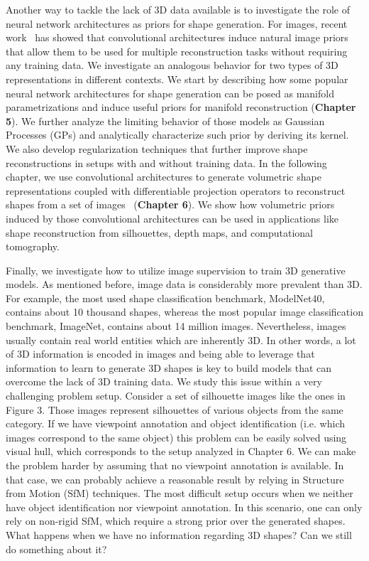 Another way to tackle the lack of 3D data available is to investigate the role of neural
network architectures as priors for shape generation.
For images, recent work~\cite{dip} has showed that convolutional architectures induce natural image priors
that allow them to be used for multiple reconstruction tasks without requiring any training data.
We investigate an analogous behavior for two types of 3D representations in different contexts.
We start by describing how some popular neural network architectures for shape generation can be
posed as manifold parametrizations and induce useful priors for manifold reconstruction
(\textbf{Chapter 5}).
We further analyze the limiting behavior of those models as Gaussian Processes (GPs) and
analytically characterize such prior by deriving its kernel.
We also develop regularization techniques that further improve shape reconstructions in setups
with and without training data.
In the following chapter, we use convolutional architectures to generate volumetric shape
representations coupled with differentiable projection operators to reconstruct shapes from
a set of images~\cite{deepshapeprior} (\textbf{Chapter 6}).
We show how volumetric priors induced by those convolutional architectures can be used in applications
like shape reconstruction from silhouettes, depth maps, and computational tomography.

Finally, we investigate how to utilize image supervision to train 3D generative models.
As mentioned before, image data is considerably more prevalent than 3D.
For example, the most used shape classification benchmark, ModelNet40, contains about 10 thousand shapes,
whereas the most popular image classification benchmark, ImageNet, contains about 14 million images.
Nevertheless, images usually contain real world entities which are inherently 3D.
In other words, a lot of 3D information is encoded in images and being able to leverage that information
to learn to generate 3D shapes is key to build models that can overcome the lack of 3D training data.
We study this issue within a very challenging problem setup.
Consider a set of silhouette images like the ones in Figure 3.
Those images represent silhouettes of various objects from the same category.
If we have viewpoint annotation and object identification (i.e. which images correspond to the same object) this problem can be easily solved using visual hull, which corresponds to the setup
analyzed in Chapter 6.
We can make the problem harder by assuming that no viewpoint annotation is available.
In that case, we can probably achieve a reasonable result by relying in Structure from Motion (SfM) techniques.
The most difficult setup occurs when we neither have object identification nor viewpoint annotation.
In this scenario, one can only rely on non-rigid SfM, which require a strong prior over the generated shapes.
What happens when we have no information regarding 3D shapes? Can we still do something about it?


